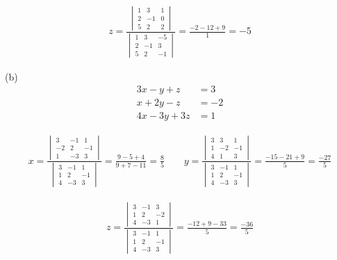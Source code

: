 \documentclass[10pt]{extarticle}
\begin{document}
\begin{itemize}
\begin{gather*}
	z=\frac{\begin{vmatrix}
			1&3&1\\
			2&-1&0\\
			5&2&2
	\end{vmatrix}}{\begin{vmatrix}
	1&3&-5\\
	2&-1&3\\
	5&2&-1
\end{vmatrix}}=\frac{-2-12+9}{1}=-5
\end{gather*}


(b)
	\begin{align*}
		3x-y+z&=3 \\
		x+2y-z&=-2 \\
		4x-3y+3z&=1
	\end{align*}

								
	\begin{gather*}
		x=\frac{\begin{vmatrix}
				3&-1&1\\
				-2&2&-1\\
				1&-3&3
		\end{vmatrix}}{\begin{vmatrix}
		3&-1&1\\
		1&2&-1\\
		4&-3&3
	\end{vmatrix}}=\frac{9-5+4}{9+7-11}=\frac{8}{5}
\qquad
	y=\frac{\begin{vmatrix}
			3&3&1\\
			1&-2&-1\\
			4&1&3
	\end{vmatrix}}{\begin{vmatrix}
	3&-1&1\\
	1&2&-1\\
	4&-3&3
\end{vmatrix}}= \frac{-15-21+9}{5}=\frac{-27}{5}
	\end{gather*}

\begin{gather*}
	z=\frac{\begin{vmatrix}
			3&-1&3\\
			1&2&-2\\
			4&-3&1
	\end{vmatrix}}{\begin{vmatrix}
	3&-1&1\\
	1&2&-1\\
	4&-3&3
\end{vmatrix}}=\frac{-12+9-33}{5}=\frac{-36}{5}
\end{gather*}








	\end{itemize}
\end{document}
